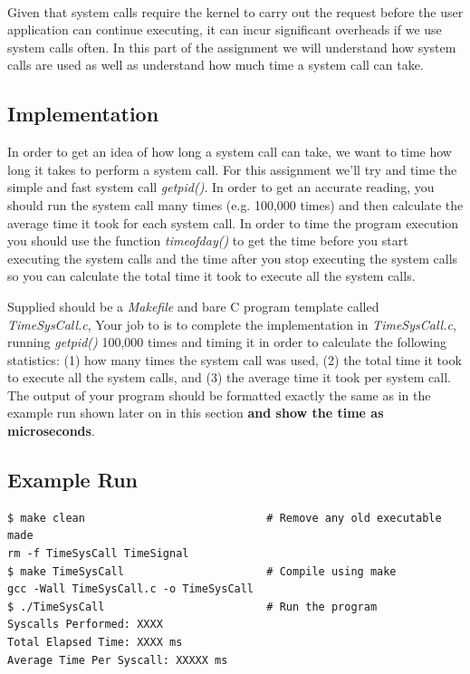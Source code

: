 \documentclass{article}
\begin{document}
\-\ \\ Given that system calls require the kernel to carry out the request before the user application can continue executing, it can incur significant overheads if we use system calls often. In this part of the assignment we will understand how system calls are used as well as understand how much time a system call can take.
 
\subsection*{Implementation}
In order to get an idea of how long a system call can take, we want to time how long it takes to perform a system call. For this assignment we'll try and time the simple and fast system call \textit{getpid()}. In order to get an accurate reading, you should run the system call many times (e.g. 100,000 times) and then calculate the average time it took for each system call. In order to time the program execution you should use the function \textit{timeofday()} to get the time before you start executing the system calls and the time after you stop executing the system calls so you can calculate the total time it took to execute all the system calls. 

Supplied should be a \textit{Makefile} and bare C program template called \textit{TimeSysCall.c}, Your job to is to complete the implementation in \textit{TimeSysCall.c}, running \textit{getpid()} 100,000 times and timing it in order to calculate the following statistics: (1) how many times the system call was used, (2) the total time it took to execute all the system calls, and (3) the average time it took per system call. The output of your program should be formatted exactly the same as in the example run shown later on in this section \textbf{and show the time as microseconds}.

\subsection*{Example Run}
\begin{commandline}
	\begin{verbatim}
$ make clean                            # Remove any old executable made
rm -f TimeSysCall TimeSignal
$ make TimeSysCall                      # Compile using make
gcc -Wall TimeSysCall.c -o TimeSysCall
$ ./TimeSysCall                         # Run the program
Syscalls Performed: XXXX
Total Elapsed Time: XXXX ms
Average Time Per Syscall: XXXXX ms
	\end{verbatim}
\end{commandline}
\end{document}
